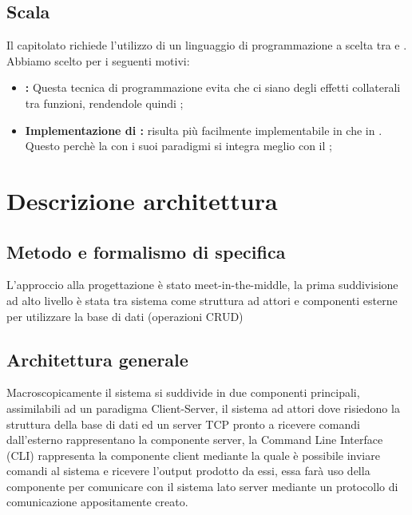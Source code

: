 \documentclass{scalatekids-article}
\begin{document}
\subsection{Scala}
Il capitolato richiede l'utilizzo di un linguaggio di programmazione a scelta tra  e . Abbiamo scelto  per i seguenti motivi:
\begin{itemize}
\item\textbf{:} Questa tecnica di programmazione evita che ci siano degli effetti collaterali tra funzioni, rendendole quindi ;
\item\textbf{Implementazione di :}  risulta più facilmente implementabile in  che in . Questo perchè la  con i suoi paradigmi si integra meglio con il ;%
\end{itemize}

\section{Descrizione architettura}

\subsection{Metodo e formalismo di specifica}

L'approccio alla progettazione è stato meet-in-the-middle, la prima suddivisione ad alto livello è stata tra sistema come struttura ad attori e
componenti esterne per utilizzare la base di dati (operazioni CRUD)

\subsection{Architettura generale}

Macroscopicamente il sistema si suddivide in due componenti principali, assimilabili ad un paradigma Client-Server, il sistema ad attori
dove risiedono la struttura della base di dati ed un server TCP pronto a ricevere comandi dall'esterno rappresentano la componente server,
la Command Line Interface (CLI) rappresenta la componente client mediante la quale è possibile inviare comandi al sistema e ricevere l'output
prodotto da essi, essa farà uso della componente  per comunicare con il sistema lato server mediante un protocollo di comunicazione
appositamente creato.
\end{document}
